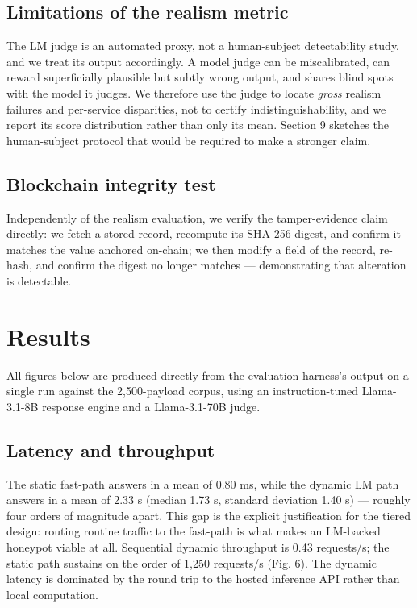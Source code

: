 \documentclass[conference]{IEEEtran}
\begin{document}
\subsection{Limitations of the realism metric}

The LM judge is an automated proxy, not a human-subject detectability study, and we treat its output accordingly. A model judge can be miscalibrated, can reward superficially plausible but subtly wrong output, and shares blind spots with the model it judges. We therefore use the judge to locate \emph{gross} realism failures and per-service disparities, not to certify indistinguishability, and we report its score distribution rather than only its mean. Section 9 sketches the human-subject protocol that would be required to make a stronger claim.

\subsection{Blockchain integrity test}

Independently of the realism evaluation, we verify the tamper-evidence claim directly: we fetch a stored record, recompute its SHA-256 digest, and confirm it matches the value anchored on-chain; we then modify a field of the record, re-hash, and confirm the digest no longer matches --- demonstrating that alteration is detectable.

\section{Results}

All figures below are produced directly from the evaluation harness's output on a single run against the 2,500-payload corpus, using an instruction-tuned Llama-3.1-8B response engine and a Llama-3.1-70B judge.

\subsection{Latency and throughput}

The static fast-path answers in a mean of 0.80 ms, while the dynamic LM path answers in a mean of 2.33 s (median 1.73 s, standard deviation 1.40 s) --- roughly four orders of magnitude apart. This gap is the explicit justification for the tiered design: routing routine traffic to the fast-path is what makes an LM-backed honeypot viable at all. Sequential dynamic throughput is 0.43 requests/s; the static path sustains on the order of 1,250 requests/s (Fig. 6). The dynamic latency is dominated by the round trip to the hosted inference API rather than local computation.
\end{document}
